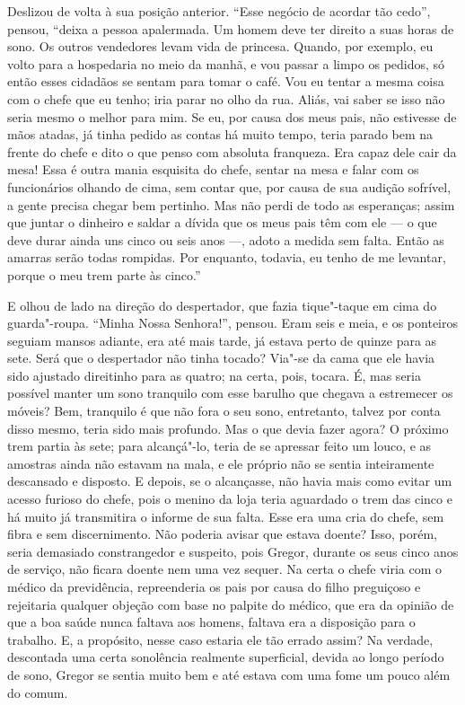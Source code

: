 Deslizou de volta à sua posição anterior. “Esse negócio de acordar tão
cedo”, pensou, “deixa a pessoa apalermada. Um homem deve ter direito a
suas horas de sono. Os outros vendedores levam vida de princesa. Quando,
por exemplo, eu volto para a hospedaria no meio da manhã, e vou passar a
limpo os pedidos, só então esses cidadãos se sentam para tomar o café. Vou
eu tentar a mesma coisa com o chefe que eu tenho; iria parar no olho da
rua. Aliás, vai saber se isso não seria mesmo o melhor para mim. Se eu,
por causa dos meus pais, não estivesse de mãos atadas, já tinha pedido as
contas há muito tempo, teria parado bem na frente do chefe e dito o que
penso com absoluta franqueza. Era capaz dele cair da mesa! Essa é outra
mania esquisita do chefe, sentar na mesa e falar com os funcionários
olhando de cima, sem contar que, por causa de sua audição sofrível, a
gente precisa chegar bem pertinho. Mas não perdi de todo as esperanças;
assim que juntar o dinheiro e saldar a dívida que os meus pais têm com ele
--- o que deve durar ainda uns cinco ou seis anos ---, adoto a medida sem
falta. Então as amarras serão todas rompidas. Por enquanto, todavia, eu
tenho de me levantar, porque o meu trem parte às cinco.”

E olhou de lado na direção do despertador, que fazia tique"-taque em cima
do guarda"-roupa. “Minha Nossa Senhora!”, pensou. Eram seis e meia, e os
ponteiros seguiam mansos adiante, era até mais tarde, já estava perto de
quinze para as sete.
Será que o despertador não tinha tocado? Via"-se da cama
que ele havia sido ajustado direitinho para as quatro; na certa, pois,
tocara. É, mas seria possível manter um sono tranquilo com esse barulho
que chegava a estremecer os móveis? Bem, tranquilo é que não fora o seu
sono, entretanto, talvez por conta disso mesmo, teria sido mais profundo.
Mas o que devia fazer agora? O próximo trem partia às sete; para
alcançá"-lo, teria de se apressar feito um louco, e as amostras ainda não
estavam na mala, e ele próprio não se sentia inteiramente descansado e
disposto. E depois, se o alcançasse, não havia mais como evitar um
acesso furioso do chefe, pois o menino da loja teria aguardado o trem das
cinco e há muito já transmitira o informe de sua falta. Esse era uma cria
do chefe, sem fibra e sem discernimento. Não poderia avisar que estava
doente? Isso, porém, seria demasiado constrangedor e suspeito, pois
Gregor, durante os seus cinco anos de serviço, não ficara doente nem uma
vez sequer. Na certa o chefe viria com o médico da previdência,
repreenderia os pais por causa do filho preguiçoso e rejeitaria qualquer
objeção com base no palpite do médico, que era da opinião de que a boa
saúde nunca faltava aos homens, faltava era a disposição para o trabalho.
E, a propósito, nesse caso estaria ele tão errado assim? Na verdade,
descontada uma certa sonolência realmente superficial, devida ao longo
período de sono, Gregor se sentia muito bem e até estava com uma fome um
pouco além do comum.

